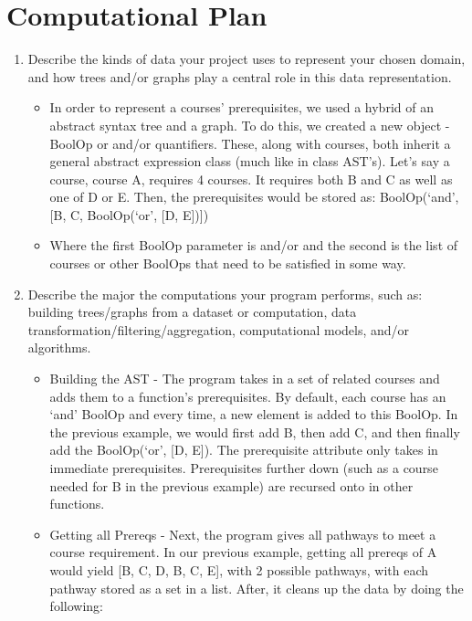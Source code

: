 \documentclass[fontsize=11pt]{article}
\begin{document}
\section*{Computational Plan}
\begin{enumerate}
    \item Describe the kinds of data your project uses to represent your chosen domain, and how trees and/or graphs play a central role in this data representation.
    \begin{itemize}
        \item In order to represent a courses’ prerequisites, we used a hybrid of an abstract syntax tree and a graph. To do this, we created a new object - BoolOp or and/or quantifiers. These, along with courses, both inherit a general abstract expression class (much like in class AST’s). Let’s say a course, course A, requires 4 courses. It requires both B and C as well as one of D or E. Then, the prerequisites would be stored as:
\newline \newline
BoolOp(‘and’, [B, C, BoolOp(‘or’, [D, E])])
\newline 
        \item Where the first BoolOp parameter is and/or and the second is the list of courses or other BoolOps that need to be satisfied in some way.
    \end{itemize}
    \item Describe the major the computations your program performs, such as: building trees/graphs from a dataset or computation, data transformation/filtering/aggregation, computational models, and/or algorithms.
    \begin{itemize}
        \item Building the AST - The program takes in a set of related courses and adds them to a function's prerequisites. By default, each course has an ‘and’ BoolOp and every time, a new element is added to this BoolOp. In the previous example, we would first add B, then add C, and then finally add the BoolOp(‘or’, [D, E]). The prerequisite attribute only takes in immediate prerequisites. Prerequisites further down (such as a course needed for B in the previous example) are recursed onto in other functions.
        \item Getting all Prereqs - Next, the program gives all pathways to meet a course requirement. In our previous example, getting all prereqs of A would yield [{B, C, D}, {B, C, E}], with 2 possible pathways, with each pathway stored as a set in a list. After, it cleans up the data by doing the following: \begin{itemize}

\end{itemize}
\end{itemize}
\end{enumerate}
\end{document}
